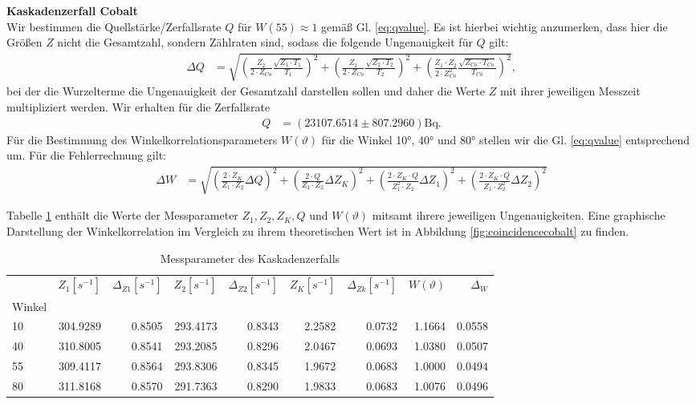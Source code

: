 \documentclass[%
aps,
onecolumn,
11pt,
tightenlines,
nofootinbib,
superscriptaddress,
floatfix,
prd,
]{revtex4-2}
\begin{document}
\textbf{Kaskadenzerfall Cobalt}\\
Wir bestimmen die Quellstärke/Zerfallsrate $Q$ für $W(55)\approx 1$ gemäß Gl. \ref{eq:qvalue}. Es ist hierbei wichtig anzumerken, dass hier die Größen $Z$ nicht die Gesamtzahl, sondern Zählraten sind, sodass die folgende Ungenauigkeit für $Q$ gilt:
\begin{align}
	\Delta Q &= \sqrt{ \left(\frac{Z_2}{2 \cdot Z_{Co}}\frac{\sqrt{Z_1 \cdot T_1}}{T_1} \right)^2 + \left(\frac{Z_1}{2 \cdot Z_{Co}}\frac{\sqrt{Z_2 \cdot T_2}}{T_2} \right)^2 + \left(\frac{Z_1 \cdot Z_2}{2 \cdot Z_{Co}^2}\frac{\sqrt{Z_{Co} \cdot T_{Co}}}{T_{Co}} \right)^2  },
\end{align}
bei der die Wurzelterme die Ungenauigkeit der Gesamtzahl darstellen sollen und daher die Werte $Z$ mit ihrer jeweiligen Messzeit multipliziert werden. Wir erhalten für die Zerfallsrate
\begin{align}
	Q &= (23107.6514 \pm 807.2960) \text{Bq}.
\end{align}
Für die Bestimmung des Winkelkorrelationsparameters $W(\vartheta)$ für die Winkel 10°, 40° und 80° stellen wir die Gl. \ref{eq:qvalue} entsprechend um. Für die Fehlerrechnung gilt:
\begin{align}
	\Delta W &= \sqrt{ \left( \frac{2 \cdot Z_K}{Z_1 \cdot Z_2} \Delta Q  \right)^2 + \left( \frac{2 \cdot Q}{Z_1 \cdot Z_2} \Delta Z_K  \right)^2 + \left( \frac{2 \cdot Z_K \cdot Q}{Z_1^2 \cdot Z_2} \Delta Z_1  \right)^2 + \left( \frac{2 \cdot Z_K \cdot Q}{Z_1 \cdot Z_2^2} \Delta Z_2  \right)^2 }
\end{align}

Tabelle \ref{tab:qtable} enthält die Werte der Messparameter $Z_1, Z_2, Z_K, Q$ und $W(\vartheta)$ mitsamt ihrere jeweiligen Ungenauigkeiten. Eine graphische Darstellung der Winkelkorrelation im Vergleich zu ihrem theoretischen Wert ist in Abbildung \ref{fig:coincidencecobalt} zu finden.
\begin{table}[H]
\centering
\begin{tabular}{lrrrrrrrr}
\toprule
 & $Z_1 [s^{-1}]$ & $\Delta_{Z1} [s^{-1}]$ & $Z_2 [s^{-1}]$ & $\Delta_{Z2} [s^{-1}]$ & $Z_K [s^{-1}]$ & $\Delta_{Zk} [s^{-1}]$ & $W(\vartheta)$ & $\Delta_W$ \\
Winkel &  &  &  &  &  &  &  &  \\
\midrule
10 & 304.9289 & 0.8505 & 293.4173 & 0.8343 & 2.2582 & 0.0732 & 1.1664 & 0.0558 \\
40 & 310.8005 & 0.8541 & 293.2085 & 0.8296 & 2.0467 & 0.0693 & 1.0380 & 0.0507 \\
55 & 309.4117 & 0.8564 & 293.8306 & 0.8345 & 1.9672 & 0.0683 & 1.0000 & 0.0494 \\
80 & 311.8168 & 0.8570 & 291.7363 & 0.8290 & 1.9833 & 0.0683 & 1.0076 & 0.0496 \\
\bottomrule
\end{tabular}
\caption{Messparameter des Kaskadenzerfalls}
\label{tab:qtable}
\end{table}
\end{document}
